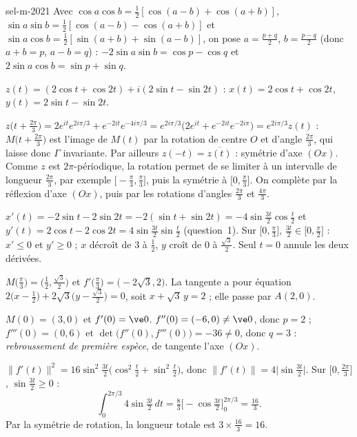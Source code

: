 \begin{corrige}{sel-m-2021}
 Avec $\cos a\cos b=\frac12[\cos(a-b)+\cos(a+b)]$, $\sin a\sin b=\frac12[\cos(a-b)-\cos(a+b)]$ et $\sin a\cos b=\frac12[\sin(a+b)+\sin(a-b)]$, on pose $a=\frac{p+q}2$, $b=\frac{p-q}2$ (donc $a+b=p$, $a-b=q$) : $-2\sin a\sin b=\cos p-\cos q$ et $2\sin a\cos b=\sin p+\sin q$.

 $z(t)=(2\cos t+\cos2t)+i(2\sin t-\sin2t)$ : $x(t)=2\cos t+\cos2t$, $y(t)=2\sin t-\sin2t$.

 $z\big(t+\frac{2\pi}3\big)=2e^{it}e^{2i\pi/3}+e^{-2it}e^{-4i\pi/3}=e^{2i\pi/3}\big(2e^{it}+e^{-2it}e^{-2i\pi}\big)=e^{2i\pi/3}z(t)$ : $M\big(t+\frac{2\pi}3\big)$ est l'image de $M(t)$ par la rotation de centre $O$ et d'angle $\frac{2\pi}3$, qui laisse donc $\Gamma$ invariante. Par ailleurs $z(-t)=\overline{z(t)}$ : symétrie d'axe $(Ox)$.
Comme $z$ est $2\pi$-périodique, la rotation permet de se limiter à un intervalle de longueur $\frac{2\pi}3$, par exemple $\big[-\frac\pi3,\frac\pi3\big]$, puis la symétrie à $\big[0,\frac\pi3\big]$. On complète par la réflexion d'axe $(Ox)$, puis par les rotations d'angles $\frac{2\pi}3$ et $\frac{4\pi}3$.

 $x'(t)=-2\sin t-2\sin2t=-2(\sin t+\sin2t)=-4\sin\frac{3t}2\cos\frac t2$ et $y'(t)=2\cos t-2\cos2t=4\sin\frac{3t}2\sin\frac t2$ (question~1). Sur $\big[0,\frac\pi3\big]$, $\frac{3t}2\in\big[0,\frac\pi2\big]$ : $x'\leq0$ et $y'\geq0$ ; $x$ décroît de $3$ à $\frac12$, $y$ croît de $0$ à $\frac{\sqrt3}2$. Seul $t=0$ annule les deux dérivées.

 $M\big(\frac\pi3\big)=\big(\frac12,\frac{\sqrt3}2\big)$ et $f'\big(\frac\pi3\big)=\big(-2\sqrt3,2\big)$. La tangente a pour équation $2\big(x-\frac12\big)+2\sqrt3\big(y-\frac{\sqrt3}2\big)=0$, soit $x+\sqrt3\,y=2$ ; elle passe par $A(2,0)$.

 $M(0)=(3,0)$ et $f'(0)=\ve0$. $f''(0)=(-6,0)\neq\ve0$, donc $p=2$ ; $f'''(0)=(0,6)$ et $\det\big(f''(0),f'''(0)\big)=-36\neq0$, donc $q=3$ : \emph{rebroussement de première espèce}, de tangente l'axe $(Ox)$.

 $\|f'(t)\|^2=16\sin^2\frac{3t}2\big(\cos^2\frac t2+\sin^2\frac t2\big)$, donc $\|f'(t)\|=4\big|\sin\frac{3t}2\big|$. Sur $\big[0,\frac{2\pi}3\big]$, $\sin\frac{3t}2\geq0$ :
\[\int_0^{2\pi/3}4\sin\tfrac{3t}2\,dt=\tfrac83\Big[-\cos\tfrac{3t}2\Big]_0^{2\pi/3}=\tfrac{16}3.\]
Par la symétrie de rotation, la longueur totale est $3\times\frac{16}3=16$.


\end{corrige}
